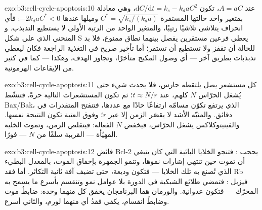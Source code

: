 \begin{solution}{exo:b3:cell-cycle-apoptosis:10}
عند $A = aC$، تكون $\mathrm{d}C/\mathrm{d}t = k_{s} - k_{d}aC^{2}$، وهي
معادلة بمتغير واحد حالتها المستقرة $C^{*} = \sqrt{k_{s}/(k_{d}a)}$
وميلها عندها $-2k_{d}aC^{*} < 0$: فأي انحراف يتلاشى
تلاشيًا رتيبًا، والمتغير الواحد من الرتبة الأولى لا يستطيع التذبذب. و
المنحني الذي على شكل S يعطي فرعين مستقرين يفصل بينهما نطاق
ممنوع، فلا بد للحالة أن تقفز ولا تستطيع أن تستقر؛ أما تأخير صريح في
التغذية الراجعة فكان ليعطي تذبذبات بطريق آخر --- أي وصول المكبح
متأخرًا، وتجاوز الهدف، وهكذا --- كما في كثير من
الإيقاعات الهرمونية.
\end{solution}

\begin{solution}{exo:b3:cell-cycle-apoptosis:11}
كل مستشعر يصل يلتقطه حارس، فلا يحدث شيء
حتى يُشغل الحرّاس $N$ كلهم، عند $t \approx N/r$؛ ثم تكون
المستشعرات التالية حرةً، فتنشّط Bax/Bak، الذي يرتفع تكوّن مسامّه ارتفاعًا حادًا
مع عددها، فتنفتح المتقدرات في دقائق. والمنبّه الأشد
لا يقصّر الزمن إلا عبر $r$؛ وفوق العتبة تكون
النتيجة نفسها. والفينيتوكلاكس يشغل الحرّاس، فيخفض
$N$ الفعالة: فيتقلص الزمن، وتموت الخلية المهيّأة --- القريبة سلفًا من $N$
--- فورًا.
\end{solution}

\begin{solution}{exo:b3:cell-cycle-apoptosis:12}
فائض Bcl-2 يحجب : فتنجو الخلايا البائية التي كان ينبغي أن تموت
حين تنتهي إشارات نموها، وتنمو الجمهرة بإخفاق
الموت، بالمعدل البطيء الذي تُصنع به تلك الخلايا --- فتكون وديعة،
حتى تضيف آفة ثانية التكاثر. أما فقد Rb فيزيل
: فتمضي طلائع الشبكية في الدورة
بلا عوامل نمو وتنقسم بأسرع ما يسمح به المحرّك ---
فتكون عدوانية. والورمان هما البرنامجان يخفق كل منهما وحده:
ضابطُ موت وضابطُ انقسام، يكفي فقدُ أي منهما
لورم، والثاني أسرع.
\end{solution}

